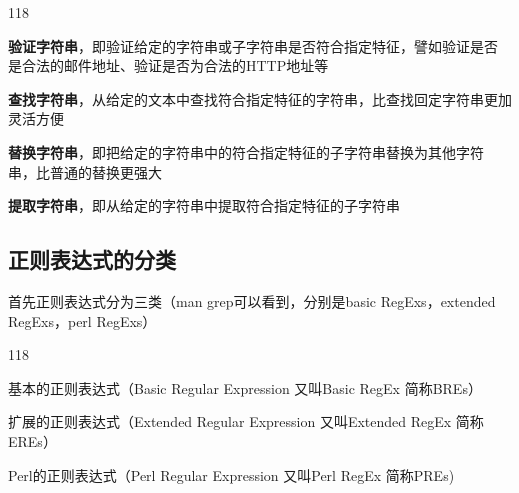 \begin{dinglist}{118}
	\item \textbf{验证字符串}，即验证给定的字符串或子字符串是否符合指定特征，譬如验证是否
	是合法的邮件地址、验证是否为合法的HTTP地址等
	\item \textbf{查找字符串}，从给定的文本中查找符合指定特征的字符串，比查找回定字符串更加灵活方便
	\item \textbf{替换字符串}，即把给定的字符串中的符合指定特征的子字符串替换为其他字符
	串，比普通的替换更强大
	\item \textbf{提取字符串}，即从给定的字符串中提取符合指定特征的子字符串
\end{dinglist}

\subsection{正则表达式的分类}
首先正则表达式分为三类（man grep可以看到，分别是basic RegExs，extended RegExs，perl RegExs）
\begin{dinglist}{118}
\item 基本的正则表达式（Basic Regular Expression 又叫Basic RegEx 简称BREs）
\item 扩展的正则表达式（Extended Regular Expression 又叫Extended RegEx 简称EREs）
\item Perl的正则表达式（Perl Regular Expression 又叫Perl RegEx 简称PREs)
\end{dinglist}


